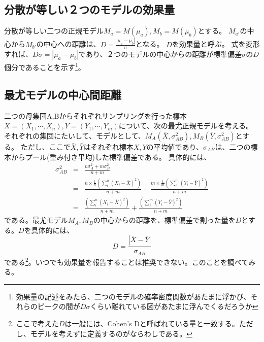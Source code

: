 \subsection{分散が等しい２つのモデルの効果量}
分散が等しい二つの正規モデル$M_a=M(\mu_a),M_b=M(\mu_b)$とする。
$M_{a'}$の中心から$M_{b'}$の中心への距離は、$D=\frac{|\mu_a-\mu_b|}{\sigma}$となる。
$D$を効果量と呼ぶ。
式を変形すれば、$D\sigma = |\mu_a-\mu_b|$であり、２つのモデルの中心からの距離が標準偏差$\sigma$の$D$個分であることを示す\footnote{効果量の記述をみたら、二つのモデルの確率密度関数があたまに浮かび、それらのピークの間が$D\sigma$くらい離れている図があたまに浮んでくるだろうか}。


\subsection{最尤モデルの中心間距離}
二つの母集団A,Bからそれぞれサンプリングを行った標本$X=(X_1,\cdots,X_n),Y=(Y_1,\cdots,Y_m)$について、次の最尤正規モデルを考える。
それぞれの集団にたいして、モデルとして、$M_A(\bar{X},\sigma_{AB}^2),M_B(\bar{Y},\sigma_{AB}^2)$とする。
ただし、ここで$\bar{X},\bar{Y}$はそれぞれ標本$X,Y$の平均値であり、$\sigma_{AB}$は、二つの標本からプール(重み付き平均)した標準偏差である。
具体的には、
\begin{eqnarray*}
 \sigma_{AB}^2 &=& \frac{n\sigma_A^2+m\sigma_B^2 }{n+m}\\
 & = & \frac{n\times \frac{1}{n}(\sum_i^n (X_i -\bar{X})^2)  }{n+m} + \frac{m\times \frac{1}{m} (\sum_i^m (Y_i -\bar{Y})^2)  }{n+m} \\
 & = & \frac{(\sum_i^n (X_i -\bar{X})^2)  }{n+m} + \frac{(\sum_i^m (Y_i -\bar{Y})^2)  }{n+m}
\end{eqnarray*}
である。最尤モデル$M_A,M_B$の中心からの距離を、標準偏差で割った量を$D$とする。$D$を具体的には、
\begin{equation*}
 D = \frac{|\bar{X}-\bar{Y}|}{\sigma_{AB}}
\end{equation*}
である\footnote{ここで考えた$D$は一般には、Cohen's Dと呼ばれている量と一致する。ただし、モデルを考えずに定義するのがならわしである。}。いつでも効果量を報告することは推奨できない。このことを調べてみる。

